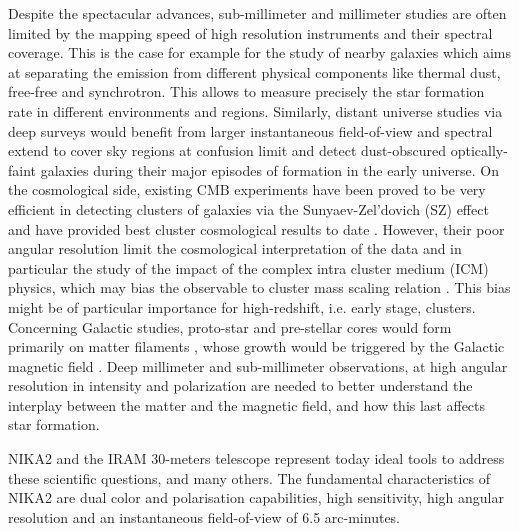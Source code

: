 \documentclass[]{aa} %
\begin{document}
Despite the spectacular advances, sub-millimeter and millimeter studies are often limited by the mapping speed of high resolution instruments and their spectral coverage. 
This is the case for example for the study of nearby galaxies which aims at separating the emission from different physical components like thermal dust, free-free and synchrotron. This allows to measure precisely the star formation rate in different environments and regions. 
Similarly, distant universe studies via deep surveys would benefit from larger instantaneous field-of-view and spectral extend to cover sky regions at confusion limit and detect dust-obscured optically-faint galaxies during their major episodes of formation in the early universe. 
On the cosmological side, existing CMB experiments have been proved to be very efficient in detecting clusters of galaxies via the Sunyaev-Zel\textquoteright dovich (SZ) effect \cite{plancksz,actsz,sptsz} and have provided best cluster cosmological results to date \cite{planckpapers}. However, their poor angular resolution limit the cosmological interpretation of the data and in particular the study of the impact of the complex intra cluster medium (ICM) physics, which may bias the observable to cluster mass scaling relation \cite{planckcosmo}. This bias might be of particular importance for high-redshift, i.e. early stage, clusters. 
Concerning Galactic studies, proto-star and pre-stellar cores would form primarily on matter filaments \cite{}, whose growth would  be triggered by the Galactic magnetic field \cite{}. Deep millimeter and sub-millimeter observations, at high angular resolution in intensity and polarization are needed to better understand the interplay between the matter and the magnetic field, and how this last affects star formation. 

NIKA2 and the IRAM 30-meters telescope represent today ideal tools to address these scientific questions, and many others. The fundamental characteristics of NIKA2 are dual color and polarisation capabilities, high sensitivity, high angular resolution and an instantaneous field-of-view of 6.5 arc-minutes. 


\end{document}
